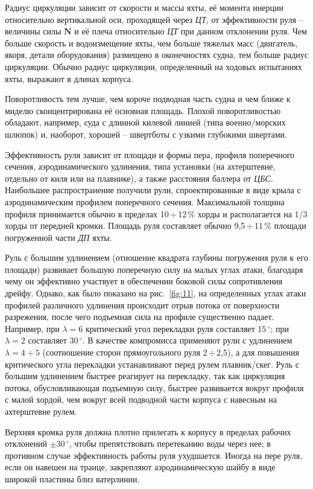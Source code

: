 \documentclass[a4paper, 12pt, twoside, final, book, russian, fittopage, cyremdash]{ncc}
\newcommand{\ve}[1]{\ensuremath{\mathbf{#1}}\xspace}
\newcommand{\gr}{\ensuremath{\,^\circ}\xspace}
\newcommand{\otdo}{\,\ensuremath{\div}\,}
\newcommand{\motdo}{\div}
\newcommand{\ris}[1]{\ref{fig:#1}}
\begin{document}
Радиус циркуляции зависит от скорости и массы яхты, её момента инерции относительно вертикальной оси, проходящей через \textit{ЦТ}, от эффективности руля \--- величины силы \ve N и её плеча относительно \textit{ЦТ} при данном отклонении руля. Чем больше скорость и водоизмещение яхты, чем больше тяжелых масс (двигатель, якоря, детали оборудования) размещено в оконечностях судна, тем больше радиус циркуляции. Обычно радиус циркуляции, определенный на ходовых испытаниях яхты, выражают в длинах корпуса.

Поворотливость тем лучше, чем короче подводная часть судна и чем ближе к миделю сконцентрирована её основная площадь. Плохой поворотливостью обладают, например, суда с длинной килевой линией (типа военно\-/морских шлюпок) и, наоборот, хорошей \--- швертботы с узкими глубокими швертами. 

Эффективность руля зависит от площади и формы пера, профиля поперечного сечения, аэродинамического удлинения, типа установки (на ахтерштевне, отдельно от киля или на плавнике), а также расстояния баллера от \textit{ЦБС}. Наибольшее распространение получили рули, спроектированные в виде крыла с аэродинамическим профилем поперечного сечения. Максимальной толщина профиля принимается обычно в пределах 10\otdo 12\,\% хорды и располагается на 1/3 хорды от передней кромки. Площадь руля составляет обычно 9,5\otdo 11\,\% площади погруженной части \textit{ДП} яхты. 

Руль с большим удлинением (отношение квадрата глубины погружения руля к его площади) развивает большую поперечную силу на малых углах атаки, благодаря чему он эффективно участвует в обеспечении боковой силы сопротивления дрейфу. Однако, как было показано на рис.~\ris{11}, на определенных углах атаки профилей различного удлинения происходит отрыв потока от поверхности разрежения, после чего подъемная сила на профиле существенно падает. Например, при $\lambda = 6$ критический угол перекладки руля составляет 15\gr; при $\lambda = 2$ составляет 30\gr. В качестве компромисса применяют рули с удлинением $\lambda = 4 \motdo 5$ (соотношение сторон прямоугольного руля 2\otdo 2,5), а для повышения критического угла перекладки устанавливают перед рулем плавник\-/скег. Руль с большим удлинением быстрее реагирует на перекладку, так как циркуляция потока, обусловливающая подъемную силу, быстрее развивается вокруг профиля с малой хордой, чем вокруг всей подводной части корпуса с навесным на ахтерштевне рулем. 

Верхняя кромка руля должна плотно прилегать к корпусу в пределах рабочих отклонений $\pm 30\gr$, чтобы препятствовать перетеканию воды через нее; в противном случае эффективность работы руля ухудшается. Иногда на пере руля, если он навешен на транце, закрепляют аэродинамическую шайбу в виде широкой пластины близ ватерлинии.
\end{document}
